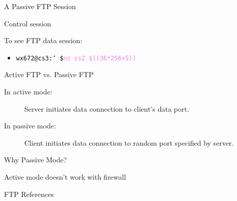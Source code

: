             
\begin{frame}{A Passive FTP Session}
  \begin{block}{Control session}
    \begin{center}
    \end{center}
  \end{block}
  \begin{block}{To see FTP data session:}
    \begin{itemize}
    \item[] \texttt{wx672@cs3:\char`~\$}\quad\textcolor{violet}{\texttt{nc cs2 \$((36*256+5))}}
    \end{itemize}
  \end{block}
\end{frame}

\begin{frame}{Active FTP vs. Passive FTP}
  \begin{description}
  \item[In active mode:] Server initiates data connection to client's data port.
  \item[In passive mode:] Client initiates data connection to random port specified by
    server.
  \end{description}
\end{frame}

\begin{frame}{Why Passive Mode?}
  \begin{block}{Active mode doesn't work with firewall}
    \begin{center}
    \end{center}
  \end{block}
\end{frame}

\begin{frame}{FTP References}
  \begin{refsection}
    \nocite{wiki:ftp, rfc959,rfc1579}
    \printbibliography[heading=none]
  \end{refsection}
\end{frame}

